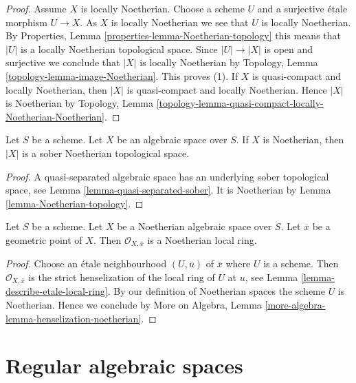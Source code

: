 \begin{proof}
Assume $X$ is locally Noetherian.
Choose a scheme $U$ and a surjective \'etale morphism
$U \to X$. As $X$ is locally Noetherian we see that $U$ is locally
Noetherian. By
Properties, Lemma \ref{properties-lemma-Noetherian-topology}
this means that $|U|$ is a locally Noetherian topological space.
Since $|U| \to |X|$ is open and surjective we conclude that
$|X|$ is locally Noetherian by
Topology, Lemma \ref{topology-lemma-image-Noetherian}.
This proves (1). If $X$ is quasi-compact and locally Noetherian,
then $|X|$ is quasi-compact and locally Noetherian. Hence $|X|$
is Noetherian by
Topology,
Lemma \ref{topology-lemma-quasi-compact-locally-Noetherian-Noetherian}.
\end{proof}

\begin{lemma}
\label{lemma-Noetherian-sober}
Let $S$ be a scheme. Let $X$ be an algebraic space over $S$.
If $X$ is Noetherian, then $|X|$ is a sober Noetherian topological space.
\end{lemma}

\begin{proof}
A quasi-separated algebraic space has an underlying sober topological
space, see
Lemma \ref{lemma-quasi-separated-sober}.
It is Noetherian by
Lemma \ref{lemma-Noetherian-topology}.
\end{proof}

\begin{lemma}
\label{lemma-Noetherian-local-ring-Noetherian}
Let $S$ be a scheme. Let $X$ be a Noetherian algebraic space over $S$.
Let $\overline{x}$ be a geometric point of $X$. Then
$\mathcal{O}_{X, \overline{x}}$ is a Noetherian local ring.
\end{lemma}

\begin{proof}
Choose an \'etale neighbourhood $(U, \overline{u})$ of $\overline{x}$
where $U$ is a scheme. Then $\mathcal{O}_{X, \overline{x}}$ is the
strict henselization of the local ring of $U$ at $u$, see
Lemma \ref{lemma-describe-etale-local-ring}.
By our definition of Noetherian spaces the scheme $U$ is Noetherian.
Hence we conclude by
More on Algebra, Lemma \ref{more-algebra-lemma-henselization-noetherian}.
\end{proof}








\section{Regular algebraic spaces}
\label{section-regular}

